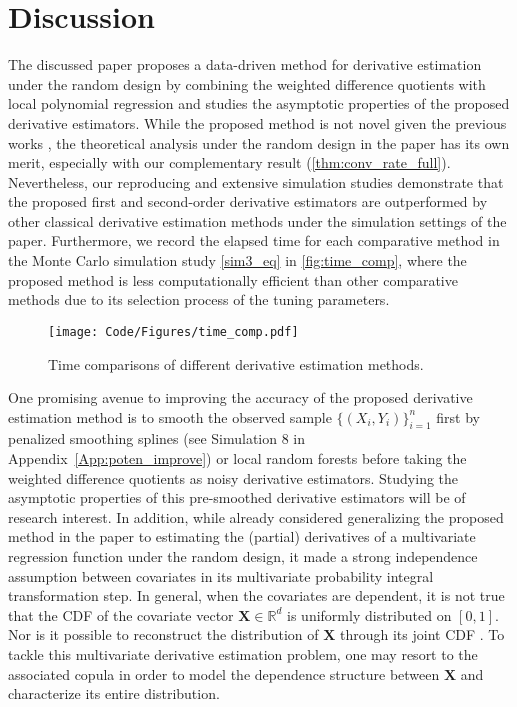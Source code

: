 \documentclass{uwstat572}
\theoremstyle{definition}
\theoremstyle{theorem}
\begin{document}

\section{Discussion}

The discussed paper \citep{liu2020smoothed} proposes a data-driven method for derivative estimation under the random design by combining the weighted difference quotients with local polynomial regression and studies the asymptotic properties of the proposed derivative estimators. While the proposed method is not novel given the previous works \citep{de2013derivative,de2018local}, the theoretical analysis under the random design in the paper has its own merit, especially with our complementary result (\autoref{thm:conv_rate_full}). Nevertheless, our reproducing and extensive simulation studies demonstrate that the proposed first and second-order derivative estimators are outperformed by other classical derivative estimation methods under the simulation settings of the paper. Furthermore, we record the elapsed time for each comparative method in the Monte Carlo simulation study \eqref{sim3_eq} in \autoref{fig:time_comp}, where the proposed method is less computationally efficient than other comparative methods due to its selection process of the tuning parameters.

\begin{wrapfigure}{r}{0.471\textwidth}
	\centering
	\texttt{[image: Code/Figures/time\_comp.pdf]}
	\caption{Time comparisons of different derivative estimation methods.}
	\label{fig:time_comp}
\end{wrapfigure}

One promising avenue to improving the accuracy of the proposed derivative estimation method is to smooth the observed sample $\{(X_i,Y_i)\}_{i=1}^n$ first by penalized smoothing splines (see Simulation 8 in Appendix~\ref{App:poten_improve}) or local random forests \citep{dang2021smoothed,dang2022machine} before taking the weighted difference quotients as noisy derivative estimators. Studying the asymptotic properties of this pre-smoothed derivative estimators will be of research interest. In addition, while \cite{dang2021smoothed} already considered generalizing the proposed method in the paper to estimating the (partial) derivatives of a multivariate regression function under the random design, it made a strong independence assumption between covariates in its multivariate probability integral transformation step. In general, when the covariates are dependent, it is not true that the CDF of the covariate vector $\bm{X}\in \mathbb{R}^d$ is uniformly distributed on $[0,1]$. Nor is it possible to reconstruct the distribution of $\bm{X}$ through its joint CDF \citep{genest2001multivariate}. To tackle this multivariate derivative estimation problem, one may resort to the associated copula \citep{nelsen2007introduction} in order to model the dependence structure between $\bm{X}$ and characterize its entire distribution.
\end{document}
